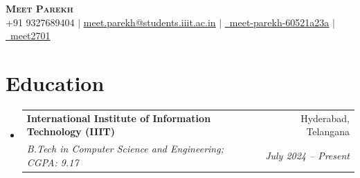\documentclass[letterpaper,11pt]{article}
\makeatletter
\newcommand{\resumeSubheading}[4]{
  \vspace{-2pt}\item
    \begin{tabular*}{0.97\textwidth}[t]{l@{\extracolsep{\fill}}r}
      \textbf{#1} & #2 \\
      \textit{\small#3} & \textit{\small #4} \\
    \end{tabular*}\vspace{-7pt}
}
\newcommand{\resumeSubHeadingListStart}{\begin{itemize}[leftmargin=0.15in, label={}]}
\newcommand{\resumeSubHeadingListEnd}{\end{itemize}}
\makeatother
\begin{document}
\begin{center}
    \textbf{\Huge \scshape Meet Parekh} \\ \vspace{1pt}
    \small +91 9327689404 $|$ \href{mailto:meet.parekh@students.iiit.ac.in}{\underline{meet.parekh@students.iiit.ac.in}} $|$ 
    \href{https://linkedin.com/in/meet-parekh-60521a23a}{\underline{\faLinkedin\ meet-parekh-60521a23a}} $|$
    \href{https://github.com/meet2701}{\underline{\faGithub\ meet2701}}
\end{center}


\section{Education}
  \resumeSubHeadingListStart
    \resumeSubheading
      {International Institute of Information Technology (IIIT)}{Hyderabad, Telangana}
      {B.Tech in Computer Science and Engineering;  CGPA: 9.17}{July 2024 -- Present}
      \vspace{-10pt}
  \resumeSubHeadingListEnd


\end{document}

